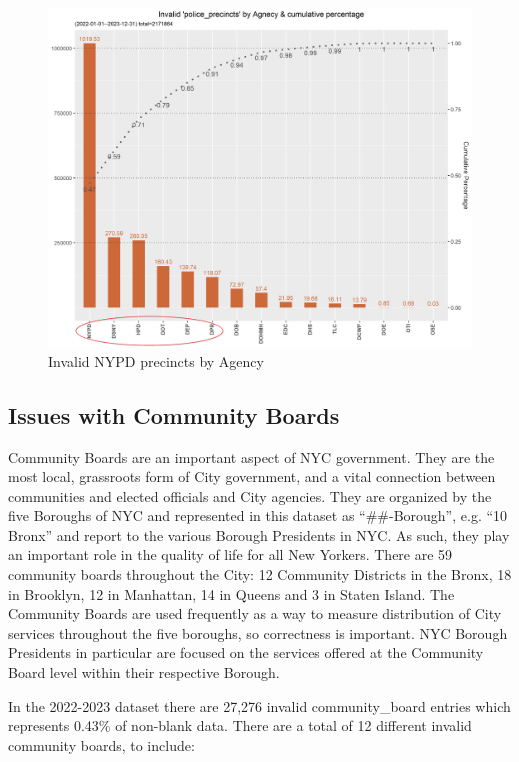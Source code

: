 \documentclass[12pt, titlepage]{article}
\begin{document}
{	\begin{figure}[H]
	  \centering
		  \includegraphics[width=\textwidth]{invalid_police_precincts.png}
		  \caption{Invalid NYPD precincts by Agency}
		  \label{fig:invalid_police_precincts_zip}
	\end{figure}

	\subsection{Issues with Community Boards}
	Community Boards are an important aspect of NYC government. They are the most local, grassroots form of City government, 
	and a vital connection between communities and elected officials and City agencies. They are organized by the five Boroughs of NYC and represented
	in this dataset as ``\#\#-Borough'', e.g. ``10 Bronx'' and report to the various Borough Presidents in NYC. As such, they play an important role in the quality of life for all New Yorkers.
	There are 59 community boards throughout the City: 12 Community Districts in the Bronx, 18 in Brooklyn, 12 in Manhattan, 14 in Queens and 3 in Staten Island.
	The Community Boards are used frequently as a way to measure distribution of City services throughout the five boroughs, so correctness is important. 
	NYC Borough Presidents in particular are focused on the services offered at the Community Board level within their respective Borough.
	
	In the 2022-2023 dataset there are 27,276 invalid community\_board entries which represents 0.43\% of non-blank data. 
	There are a total of 12 different invalid community boards, to include: 
	
}
\end{document}
